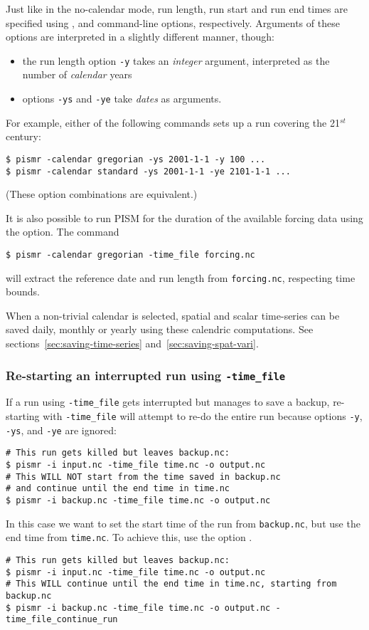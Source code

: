 Just like in the no-calendar mode, run length, run start and run end
times are specified using ,  and
 command-line options, respectively. Arguments of
these options are interpreted in a slightly different manner, though:
\begin{itemize}
\item the run length option \texttt{-y} takes an \emph{integer}
  argument, interpreted as the number of \emph{calendar} years
\item options \texttt{-ys} and \texttt{-ye} take \emph{dates} as arguments.
\end{itemize}

For example, either of the following commands sets up a run covering the 21$^{st}$ century:
\begin{verbatim}
$ pismr -calendar gregorian -ys 2001-1-1 -y 100 ...
$ pismr -calendar standard -ys 2001-1-1 -ye 2101-1-1 ...
\end{verbatim}
(These option combinations are equivalent.)

It is also possible to run PISM for the duration of the available forcing data using the  option.  The command
\begin{verbatim}
$ pismr -calendar gregorian -time_file forcing.nc
\end{verbatim}
will extract the reference date and run length from \texttt{forcing.nc}, respecting time bounds.

When a non-trivial calendar is selected, spatial and scalar time-series can be saved daily, monthly or yearly using these calendric computations. See sections~\ref{sec:saving-time-series} and~\ref{sec:saving-spat-vari}.

\subsubsection{Re-starting an interrupted run using \texttt{-time_file}}
\label{sec:time-file-restart}

If a run using \texttt{-time_file} gets interrupted but manages to save a backup, re-starting with \texttt{-time_file} will attempt to re-do the entire run because options \texttt{-y}, \texttt{-ys}, and \texttt{-ye} are ignored:
\begin{verbatim}
# This run gets killed but leaves backup.nc:
$ pismr -i input.nc -time_file time.nc -o output.nc
# This WILL NOT start from the time saved in backup.nc
# and continue until the end time in time.nc
$ pismr -i backup.nc -time_file time.nc -o output.nc
\end{verbatim}
In this case we want to set the start time of the run from \texttt{backup.nc}, but use the end time from \texttt{time.nc}. To achieve this, use the option .
\begin{verbatim}
# This run gets killed but leaves backup.nc:
$ pismr -i input.nc -time_file time.nc -o output.nc
# This WILL continue until the end time in time.nc, starting from backup.nc
$ pismr -i backup.nc -time_file time.nc -o output.nc -time_file_continue_run
\end{verbatim}

